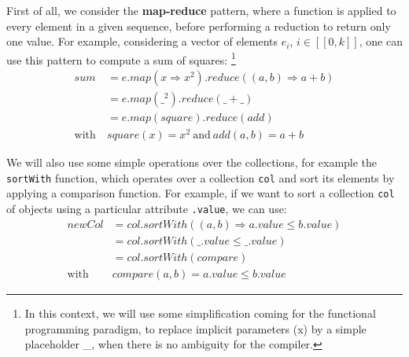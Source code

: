 \clearpage
            First of all, we consider the {\bf map-reduce} pattern, where a function is applied to every element in a given sequence, before performing a reduction to return only one value.
            For example, considering a vector of elements $e_i$, $i \in [\![0, k]\!]$, one can use this pattern to compute a sum of squares:%
            \footnote{In this context, we will use some simplification coming for the functional programming paradigm, to replace implicit parameters (\eg x) by a simple placeholder \_, when there is no ambiguity for the compiler.}
            \begin{equation}
                \label{ch.dse:sec.functional:ssec.formalization:eq.mapreduce}
                \begin{split}
                    sum &= e.map(x \Rightarrow x^2).reduce((a, b) \Rightarrow a+b)\\
                        &= e.map(\_^2).reduce(\_+\_)\\
                        &= e.map(square).reduce(add)\\
                        \text{with}\: &square(x) = x^2 \: \text{and} \: add(a, b) = a+b
                \end{split}
            \end{equation}

            We will also use some simple operations over the collections, for example the {\tt sortWith} function, which operates over a collection {\tt col} and sort its elements by applying a comparison function.
            For example, if we want to sort a collection {\tt col} of objects using a particular attribute {\tt .value}, we can use:
            \begin{equation}
                \label{ch.dse:sec.functional:ssec.formalization:eq.sortwith}
                \begin{split}
                    newCol &= col.sortWith((a, b) \Rightarrow a.value \leq b.value)\\
                           &= col.sortWith(\_.value \leq \_.value)\\
                           &= col.sortWith(compare)\\
                       \text{with}\: &compare(a, b) = a.value \leq b.value
                \end{split}
            \end{equation}

